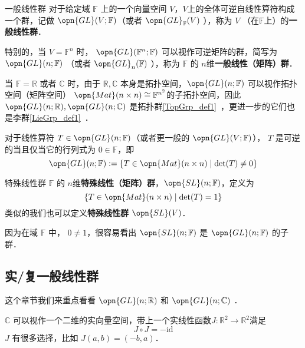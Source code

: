 
\begin{issues}
\issueDraft
\end{issues}


\begin{definition}{一般线性群}\label{GL_def1}
对于给定域 $\mathbb{F}$ 上的一个向量空间 $V$，$V$上的全体可逆自线性算符构成一个群，记做 $\opn{GL}(V; \mathbb{F})$（或者 $\opn{GL}_{\mathbb{F}}(V)$ ），称为 $V$ （在$\mathbb{F}$上）的\textbf{一般线性群}．

特别的，当 $V = \mathbb{F}^n$ 时， $\opn{GL}(\mathbb{F}^n; \mathbb{F})$ 可以视作可逆矩阵的群，简写为 $\opn{GL}(n; \mathbb{F})$ （或者 $\opn{GL}_n(\mathbb{F})$ ），称为 $\mathbb{F}$ 的 $n$维\textbf{一般线性（矩阵）群}．

当 $\mathbb{F} = \mathbb{R}$ 或者 $\mathbb{C}$ 时，由于 $\mathbb{R}, \mathbb{C}$ 本身是拓扑空间，$\opn{GL}(n; \mathbb{F})$ 可以视作拓扑空间（矩阵空间） $\opn{Mat}(n \times n) \cong \mathbb{F}^{n^2}$的子拓扑空间，因此 $\opn{GL}(n; \mathbb{R}), \opn{GL}(n; \mathbb{C})$ 是拓扑群\autoref{TopGrp_def1}~，更进一步的它们也是李群\autoref{LieGrp_def1}~．
\end{definition}

对于线性算符 $T \in \opn{GL}(n; \mathbb{F})$（或者更一般的 $\opn{GL}(V; \mathbb{F})$）， $T$ 是可逆的当且仅当它的行列式为 $0 \in \mathbb{F}$，即
$$
\opn{GL}(n; \mathbb{F}): = \{T \in \opn{Mat}(n \times n) \mid \det(T) \neq 0\}
$$

\begin{definition}{特殊线性群}
$\mathbb{F}$ 的 $n$维\textbf{特殊线性（矩阵）群}，$\opn{SL}(n; \mathbb{F})$，定义为
$$
\{T \in \opn{Mat}(n \times n) \mid \det(T) = 1\}
$$
类似的我们也可以定义\textbf{特殊线性群} $\opn{SL}(V)$．
\end{definition}

因为在域 $\mathbb{F}$ 中， $0 \neq 1$，很容易看出 $\opn{SL}(n; \mathbb{F})$ 是 $\opn{GL}(n; \mathbb{F})$ 的子群．

\subsection{实/复一般线性群}

这个章节我们来重点看看 $\opn{GL}(n; \mathbb{R})$ 和 $\opn{GL}(n; \mathbb{C})$ ．

$\mathbb{C}$ 可以视作一个二维的实向量空间，带上一个实线性函数$J: \mathbb{R}^2 \to \mathbb{R}^2$满足
$$
J \circ J = -\text{id}
$$
$J$ 有很多选择，比如 $J(a, b) = (-b, a)$．

